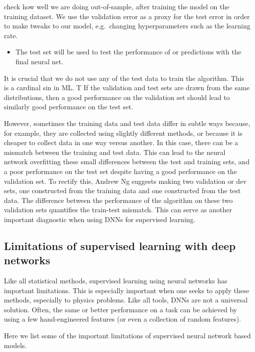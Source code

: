 \documentclass[%
oneside,                 %
final,                   %
10pt]{article}
\begin{document}
\noindent
check how well we are doing out-of-sample, after training the model on
the training dataset. We use the validation error as a proxy for the
test error in order to make tweaks to our model, e.g.~changing hyperparameters such as the learning rate.
\begin{itemize}
\item The test set will be used to test the performance of or predictions with the final neural net. 
\end{itemize}

\noindent
It is crucial that we do not use any of the test data to train the algorithm. This is a cardinal sin in ML. T If the validation and test sets are drawn from the same distributions, then a good performance on the validation set should lead to similarly good performance on the test set. 

However, sometimes
the training data and test data differ in subtle ways because, for
example, they are collected using slightly different methods, or
because it is cheaper to collect data in one way versus another. In
this case, there can be a mismatch between the training and test
data. This can lead to the neural network overfitting these small
differences between the test and training sets, and a poor performance
on the test set despite having a good performance on the validation
set. To rectify this, Andrew Ng suggests making two validation or dev
sets, one constructed from the training data and one constructed from
the test data. The difference between the performance of the algorithm
on these two validation sets quantifies the train-test mismatch. This
can serve as another important diagnostic when using DNNs for
supervised learning.

\subsection{Limitations of supervised learning with deep networks}

Like all statistical methods, supervised learning using neural
networks has important limitations. This is especially important when
one seeks to apply these methods, especially to physics problems. Like
all tools, DNNs are not a universal solution. Often, the same or
better performance on a task can be achieved by using a few
hand-engineered features (or even a collection of random
features). 

Here we list some of the important limitations of supervised neural network based models. 
\end{document}
